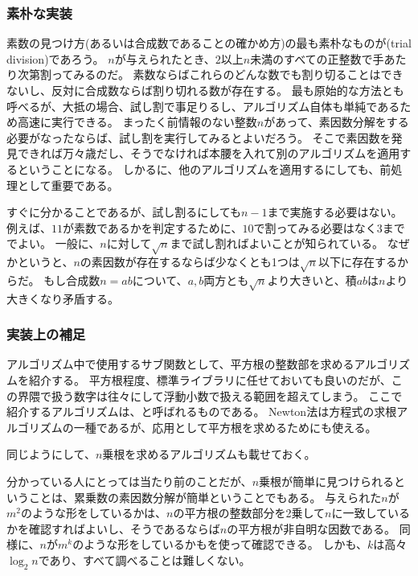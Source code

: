 \subsubsection{素朴な実装}
素数の見つけ方(あるいは合成数であることの確かめ方)の最も素朴なものが(trial division)であろう。
$n$が与えられたとき、$2$以上$n$未満のすべての正整数で手あたり次第割ってみるのだ。
素数ならばこれらのどんな数でも割り切ることはできないし、反対に合成数ならば割り切れる数が存在する。
最も原始的な方法とも呼べるが、大抵の場合、試し割で事足りるし、アルゴリズム自体も単純であるため高速に実行できる。
まったく前情報のない整数$n$があって、素因数分解をする必要がなったならば、試し割を実行してみるとよいだろう。
そこで素因数を発見できれば万々歳だし、そうでなければ本腰を入れて別のアルゴリズムを適用するということになる。
しかるに、他のアルゴリズムを適用するにしても、前処理として重要である。

すぐに分かることであるが、試し割るにしても$n-1$まで実施する必要はない。
例えば、$11$が素数であるかを判定するために、$10$で割ってみる必要はなく$3$まででよい。
一般に、$n$に対して$\sqrt{n}$まで試し割ればよいことが知られている。
なぜかというと、$n$の素因数が存在するならば少なくとも1つは$\sqrt{n}$以下に存在するからだ。
もし合成数$n=ab$について、$a,b$両方とも$\sqrt{n}$より大きいと、積$ab$は$n$より大きくなり矛盾する。


\subsubsection{実装上の補足}
アルゴリズム中で使用するサブ関数として、平方根の整数部を求めるアルゴリズムを紹介する。
平方根程度、標準ライブラリに任せておいても良いのだが、この界隈で扱う数字は往々にして浮動小数で扱える範囲を超えてしまう。
ここで紹介するアルゴリズムは、と呼ばれるものである。
Newton法は方程式の求根アルゴリズムの一種であるが、応用として平方根を求めるためにも使える。


同じようにして、$n$乗根を求めるアルゴリズムも載せておく。


分かっている人にとっては当たり前のことだが、$n$乗根が簡単に見つけられるということは、累乗数の素因数分解が簡単ということでもある。
与えられた$n$が$m^2$のような形をしているかは、$n$の平方根の整数部分を2乗して$n$に一致しているかを確認すればよいし、そうであるならば$n$の平方根が非自明な因数である。
同様に、$n$が$m^k$のような形をしているかもを使って確認できる。
しかも、$k$は高々$\log_2{n}$であり、すべて調べることは難しくない。

